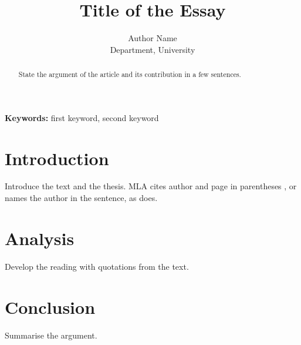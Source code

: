 \documentclass[12pt,a4paper]{article}
\title{Title of the Essay}
\author{Author Name\\ \small Department, University}
\date{}
\begin{document}
\maketitle

\begin{abstract}
State the argument of the article and its contribution in a few sentences.
\end{abstract}

\noindent\textbf{Keywords:} first keyword, second keyword

\section*{Introduction}
Introduce the text and the thesis. MLA cites author and page in parentheses
\parencite[6]{anderson1983}, or names the author in the sentence, as
\textcite{said1978} does.

\section*{Analysis}
Develop the reading with quotations from the text.

\section*{Conclusion}
Summarise the argument.

\printbibliography
\end{document}
